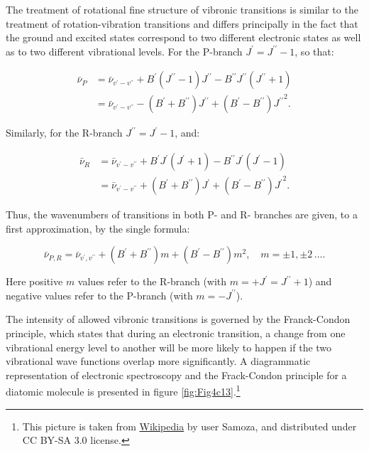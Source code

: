 \documentclass[
  9pt,
]{extbook}
\theoremstyle{definition}
\theoremstyle{definition}
\theoremstyle{definition}
\theoremstyle{remark}
\begin{document}
The treatment of rotational fine structure of vibronic transitions is similar to the treatment of rotation-vibration transitions and differs principally in the fact that the ground and excited states correspond to two different electronic states as well as to two different vibrational levels. For the P-branch \(J^{\prime }=J^{{\prime \prime}}-1\), so that:

\begin{equation}
\begin{aligned}
{\bar  \nu }_{P}&={\bar  \nu}_{{v^{\prime}-v^{\prime\prime}}}+B^{\prime}(J^{\prime\prime}-1)J^{\prime\prime}-B^{\prime\prime}J^{\prime\prime}(J^{\prime\prime}+1) \\
&={\bar  \nu }_{{v^{\prime}-v^{\prime\prime}}}-(B^{\prime}+B^{\prime\prime})J^{\prime\prime}+(B^{\prime}-B^{\prime\prime}){J^{\prime\prime}}^{2}.
\end{aligned}
\label{eq:elec2}
\end{equation}

Similarly, for the R-branch \(J^{\prime\prime }=J^{{\prime }}-1\), and:

\begin{equation}
\begin{aligned}
{\bar  \nu }_{R} &={\bar  \nu}_{{v^{\prime}-v^{\prime\prime}}}+B^{\prime}J^{\prime}(J^{\prime}+1)-B^{\prime\prime}J^{\prime}(J^{\prime}-1) \\
&={\bar  \nu }_{{v^{\prime}-v^{\prime\prime}}}+(B^{\prime}+B^{\prime\prime})J^{\prime}+(B^{\prime}-B^{\prime\prime}){J^{\prime}}^{2}.
\end{aligned}
\label{eq:elec3}
\end{equation}

Thus, the wavenumbers of transitions in both P- and R- branches are given, to a first approximation, by the single formula:

\begin{equation}
{\bar  \nu }_{{P,R}}={\bar  \nu }_{{v^{\prime },v^{{\prime \prime }}}}+(B^{\prime }+B^{{\prime \prime }})m+(B^{\prime }-B^{{\prime \prime }})m^{2},\quad m=\pm 1,\pm 2\, \ldots.
\label{eq:elec4}
\end{equation}

Here positive \(m\) values refer to the R-branch (with \(m=+J^{\prime}=J^{\prime\prime}+1\)) and negative values refer to the P-branch (with \(m=-J^{\prime\prime}\)).

The intensity of allowed vibronic transitions is governed by the Franck-Condon principle, which states that during an electronic transition, a change from one vibrational energy level to another will be more likely to happen if the two vibrational wave functions overlap more significantly. A diagrammatic representation of electronic spectroscopy and the Frack-Condon principle for a diatomic molecule is presented in figure \ref{fig:Fig4c13}.\footnote{This picture is taken from \href{https://en.wikipedia.org/wiki/Franck–Condon_principle\#/media/File:Franck_Condon_Diagram.svg}{Wikipedia} by user Samoza, and distributed under CC BY-SA 3.0 license.}
\end{document}
